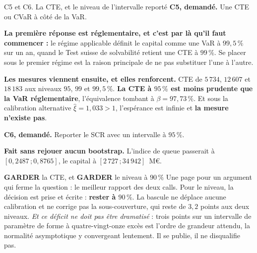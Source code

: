 \documentclass[11pt]{beamer}
\newcommand{\garder}{\textbf{GARDER}}
\newcommand{\srcs}[1]{\vspace{0.8mm}{\tiny\textcolor{gray!50!black}{Sources : #1}}}
\begin{document}
\begin{frame}{C5 et C6. La CTE, et le niveau de l'intervalle reporté}
\scriptsize
\textbf{C5, demandé.} Une CTE ou CVaR à côté de la VaR.
\vspace{1mm}

\textbf{La première réponse est réglementaire, et c'est par là qu'il faut commencer :} le régime
applicable définit le capital comme une VaR à $99{,}5\,\%$ sur un an, quand le Test suisse de
solvabilité retient une CTE à $99\,\%$. Se placer sous le premier régime est la raison
principale de ne pas substituer l'une à l'autre.
\vspace{1mm}

\textbf{Les mesures viennent ensuite, et elles renforcent.} CTE de $5\,734$, $12\,607$ et
$18\,183$ aux niveaux $95$, $99$ et $99{,}5\,\%$. \textbf{La CTE à $95\,\%$ est moins prudente
que la VaR réglementaire}, l'équivalence tombant à $\beta = 97{,}73\,\%$. Et sous la calibration
alternative $\hat\xi = 1{,}033 > 1$, l'espérance est infinie et \textbf{la mesure n'existe pas}.
\vspace{1mm}

\textbf{C6, demandé.} Reporter le SCR avec un intervalle à $95\,\%$.
\vspace{1mm}

\textbf{Fait sans rejouer aucun bootstrap.} L'indice de queue passerait à
$[0{,}2487\,;0{,}8765]$, le capital à $[2\,727\,;34\,942]$~M\euro.
\begin{block}{\garder{} la CTE, et \garder{} le niveau à $90\,\%$}
Une page pour un argument qui ferme la question : le meilleur rapport des deux calls. Pour le
niveau, la décision est prise et écrite : \textbf{rester à $90\,\%$}. La bascule ne déplace
aucune calibration et ne corrige pas la sous-couverture, qui reste de $3{,}2$ points aux deux
niveaux. \emph{Et ce déficit ne doit pas être dramatisé} : trois points sur un intervalle de
paramètre de forme à quatre-vingt-onze excès est l'ordre de grandeur attendu, la normalité
asymptotique y convergeant lentement. Il se publie, il ne disqualifie pas.
\end{block}
\srcs{scripts~\texttt{72} et~\texttt{73}}
\end{frame}
\end{document}
